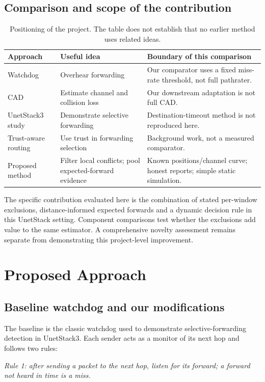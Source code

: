 \documentclass{article}
\begin{document}
\subsection{Comparison and scope of the contribution}
\begin{table}[H]\centering\small{}
\begin{tabular}{p{2.7cm}p{4.5cm}p{5.1cm}}\toprule
Approach & Useful idea & Boundary of this comparison\\\midrule
Watchdog~\cite{marti} & Overhear forwarding & Our comparator uses a fixed miss-rate threshold, not full pathrater.\\
CAD~\cite{cad} & Estimate channel and collision loss & Our downstream adaptation is not full CAD.\\
UnetStack3 study~\cite{brc} & Demonstrate selective forwarding & Destination-timeout method is not reproduced here.\\
Trust-aware routing~\cite{han} & Use trust in forwarding selection & Background work, not a measured comparator.\\
Proposed method & Filter local conflicts; pool expected-forward evidence & Known positions/channel curve; honest reports; simple static simulation.\\\bottomrule
\end{tabular}
\caption{Positioning of the project. The table does not establish that no earlier method uses related ideas.}
\end{table}
The specific contribution evaluated here is the combination of stated per-window exclusions, distance-informed expected forwards and a dynamic decision rule in this UnetStack setting. Component comparisons test whether the exclusions add value to the same estimator. A comprehensive novelty assessment remains separate from demonstrating this project-level improvement.

\section{Proposed Approach}\label{sec:method}
\subsection{Baseline watchdog and our modifications}
The baseline is the classic watchdog used to demonstrate selective-forwarding detection in UnetStack3. Each sender acts as a monitor of its next hop and follows two rules:

\textit{Rule 1: after sending a packet to the next hop, listen for its forward; a forward not heard in time is a miss.}
\end{document}
